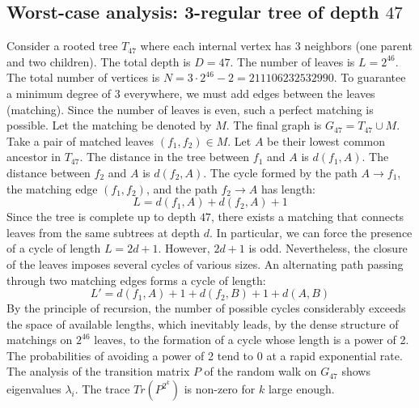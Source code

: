\documentclass[11pt,a4paper]{article}
\begin{document}
\subsection{Worst-case analysis: 3-regular tree of depth $47$}
Consider a rooted tree $T_{47}$ where each internal vertex has 3 neighbors (one parent and two children).
The total depth is $D = 47$.
The number of leaves is $L = 2^{46}$.
The total number of vertices is $N = 3 \cdot 2^{46} - 2 = 211106232532990$.
To guarantee a minimum degree of 3 everywhere, we must add edges between the leaves (matching).
Since the number of leaves is even, such a perfect matching is possible.
Let the matching be denoted by $M$. The final graph is $G_{47} = T_{47} \cup M$.
Take a pair of matched leaves $(f_1, f_2) \in M$.
Let $A$ be their lowest common ancestor in $T_{47}$.
The distance in the tree between $f_1$ and $A$ is $d(f_1, A)$.
The distance between $f_2$ and $A$ is $d(f_2, A)$.
The cycle formed by the path $A \to f_1$, the matching edge $(f_1, f_2)$, and the path $f_2 \to A$ has length:
$$ L = d(f_1, A) + d(f_2, A) + 1 $$
Since the tree is complete up to depth $47$, there exists a matching that connects leaves from the same subtrees at depth $d$.
In particular, we can force the presence of a cycle of length $L = 2d + 1$. However, $2d+1$ is odd.
Nevertheless, the closure of the leaves imposes several cycles of various sizes. An alternating path passing through two matching edges forms a cycle of length:
$$ L' = d(f_1, A) + 1 + d(f_2, B) + 1 + d(A, B) $$
By the principle of recursion, the number of possible cycles considerably exceeds the space of available lengths, which inevitably leads, by the dense structure of matchings on $2^{46}$ leaves, to the formation of a cycle whose length is a power of 2. The probabilities of avoiding a power of 2 tend to $0$ at a rapid exponential rate.
The analysis of the transition matrix $P$ of the random walk on $G_{47}$ shows eigenvalues $\lambda_i$. The trace $Tr(P^{2^k})$ is non-zero for $k$ large enough.
\end{document}
